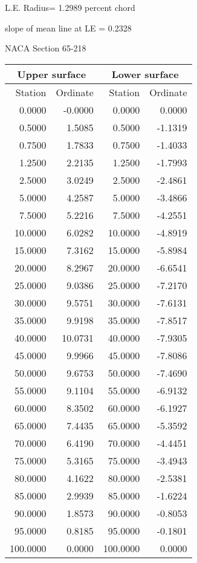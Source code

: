 \documentclass[11pt]{book}
\begin{document}
L.E. Radius=  1.2989 percent chord


 slope of mean line at LE =  0.2328
 \newpage
  \label{s65-218}
 \begin{Large}
 NACA Section 65-218
 \end{Large}
  
 \vspace{8mm}
 \begin{tabular}{|r|r|r|r|} \hline 
 \multicolumn{2}{|c|}{Upper surface} & \multicolumn{2}{|c|}{Lower surface} \\
 \hline
 Station & Ordinate & Station & Ordinate \\
 \hline
0.0000 & -0.0000 & 0.0000 & 0.0000 \\
0.5000 & 1.5085 & 0.5000 & -1.1319 \\
0.7500 & 1.7833 & 0.7500 & -1.4033 \\
1.2500 & 2.2135 & 1.2500 & -1.7993 \\
2.5000 & 3.0249 & 2.5000 & -2.4861 \\
5.0000 & 4.2587 & 5.0000 & -3.4866 \\
7.5000 & 5.2216 & 7.5000 & -4.2551 \\
10.0000 & 6.0282 & 10.0000 & -4.8919 \\
15.0000 & 7.3162 & 15.0000 & -5.8984 \\
20.0000 & 8.2967 & 20.0000 & -6.6541 \\
25.0000 & 9.0386 & 25.0000 & -7.2170 \\
30.0000 & 9.5751 & 30.0000 & -7.6131 \\
35.0000 & 9.9198 & 35.0000 & -7.8517 \\
40.0000 & 10.0731 & 40.0000 & -7.9305 \\
45.0000 & 9.9966 & 45.0000 & -7.8086 \\
50.0000 & 9.6753 & 50.0000 & -7.4690 \\
55.0000 & 9.1104 & 55.0000 & -6.9132 \\
60.0000 & 8.3502 & 60.0000 & -6.1927 \\
65.0000 & 7.4435 & 65.0000 & -5.3592 \\
70.0000 & 6.4190 & 70.0000 & -4.4451 \\
75.0000 & 5.3165 & 75.0000 & -3.4943 \\
80.0000 & 4.1622 & 80.0000 & -2.5381 \\
85.0000 & 2.9939 & 85.0000 & -1.6224 \\
90.0000 & 1.8573 & 90.0000 & -0.8053 \\
95.0000 & 0.8185 & 95.0000 & -0.1801 \\
100.0000 & 0.0000 & 100.0000 & 0.0000 \\
 \hline 
 \end{tabular}
\end{document}
